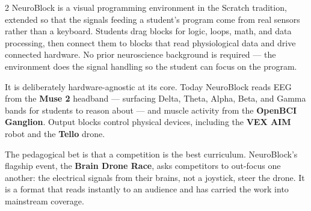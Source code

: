 \documentclass[10pt,letterpaper]{article}
\begin{document}
\noindent
\begin{minipage}[t]{0.615\linewidth}
  \begin{multicols}{2}
  NeuroBlock is a visual programming environment in the Scratch tradition, extended so that the signals feeding a student's program come from real sensors rather than a keyboard. Students drag blocks for logic, loops, math, and data processing, then connect them to blocks that read physiological data and drive connected hardware. No prior neuroscience background is required --- the environment does the signal handling so the student can focus on the program.

  It is deliberately hardware-agnostic at its core. Today NeuroBlock reads EEG from the \textbf{Muse 2} headband --- surfacing Delta, Theta, Alpha, Beta, and Gamma bands for students to reason about --- and muscle activity from the \textbf{OpenBCI Ganglion}. Output blocks control physical devices, including the \textbf{VEX AIM} robot and the \textbf{Tello} drone.

  The pedagogical bet is that a competition is the best curriculum. NeuroBlock's flagship event, the \textbf{Brain Drone Race}, asks competitors to out-focus one another: the electrical signals from their brains, not a joystick, steer the drone. It is a format that reads instantly to an audience and has carried the work into mainstream coverage.
  \end{multicols}
\end{minipage}%
\hfill
\end{document}
